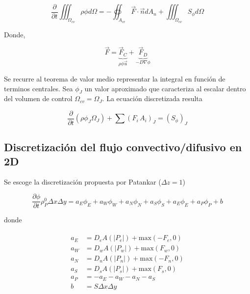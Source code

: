 \begin{equation}\dfrac{\partial}{\partial t} \iiint_{\Omega_{cv}} \rho \phi d \Omega = - \oiint_{A_{cv}} \vec{F} \cdot \vec{n} d A_n + \iiint_{\Omega_{cv}} S_{\phi} d \Omega
\end{equation}  

Donde,

\begin{equation}
\vec{F} = \underbrace{\vec{F}_C}_{\rho \phi \vec{u}} + \underbrace{\vec{F}_D}_{-D \nabla \phi}
\end{equation}

Se recurre al teorema de valor medio representar la integral en función de terminos centrales. Sea $\phi_J$ un valor aproximado que caracteriza al escalar dentro del volumen de control $\Omega_{cv} = \Omega_J$. La ecuación discretizada resulta

\begin{equation}
\dfrac{\partial}{\partial t} \left( \rho \phi_J \Omega_J \right) + \sum \left( F_i \, A_i \right)_J = \left( S_{\phi} \right)_J
\end{equation} 

\subsection{Discretización del flujo convectivo/difusivo en 2D}

Se escoge la discretización propuesta por Patankar ($\Delta z = 1$)

\begin{equation} \label{ecuacion_patankar}
\dfrac{\partial \phi}{\partial t} \rho_P^0 \Delta x \Delta y = a_E \phi_E + a_W \phi_W + a_N \phi_N + a_S \phi_S + a_E \phi_E + a_P \phi_P + b
\end{equation} 

donde 

\begin{align} \label{coeficientes_patankar}
\begin{split}
a_E &= D_e A(|P_e|) + \mbox{max}(-F_e,0) \\
a_W &= D_w A(|P_w|) + \mbox{max}(F_w,0) \\
a_N &= D_n A(|P_n|) + \mbox{max}(-F_n,0) \\
a_S &= D_s A(|P_s|) + \mbox{max}(F_s,0) \\
a_P &= -a_E -a_W -a_N -a_S \\
b &= S \Delta x \Delta y
\end{split}
\end{align}

